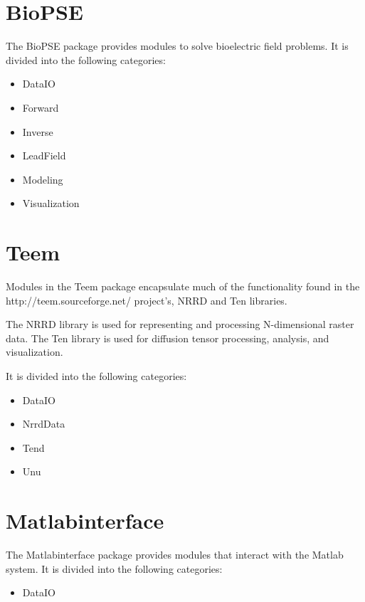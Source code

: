 \section{BioPSE}
\label{sec:biopsepackage}


The BioPSE package provides modules to solve bioelectric field
problems.  It is divided into the following categories:

\begin{itemize}
\item DataIO
\item Forward
\item Inverse
\item LeadField
\item Modeling
\item Visualization
\end{itemize}

\section{Teem}
\label{sec:teempackage}

Modules in the Teem package encapsulate much of the functionality
found in the 
{http://teem.sourceforge.net/} project's, NRRD and Ten libraries.

The NRRD library is used for representing and processing N-dimensional
raster data.  The Ten library is used for diffusion tensor processing,
analysis, and visualization.

It is divided into the following categories:

\begin{itemize}
\item DataIO
\item NrrdData
\item Tend
\item Unu
\end{itemize}

\section{Matlabinterface}
\label{sec:matlabpackage}

The Matlabinterface package provides modules that interact with the
Matlab system.  It is divided into the following categories:

\begin{itemize}
\item DataIO
\end{itemize}

